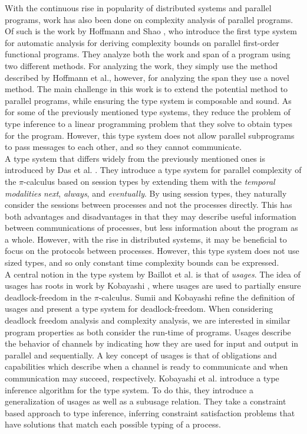 With the continuous rise in popularity of distributed systems and parallel programs, work has also been done on complexity analysis of parallel programs. Of such is the work by Hoffmann and Shao \cite{HoffmannShao2015}, who introduce the first type system for automatic analysis for deriving complexity bounds on parallel first-order functional programs. They analyze both the work and span of a program using two different methods. For analyzing the work, they simply use the method described by Hoffmann et al., however, for analyzing the span they use a novel method. The main challenge in this work is to extend the potential method to parallel programs, while ensuring the type system is composable and sound. As for some of the previously mentioned type systems, they reduce the problem of type inference to a linear programming problem that they solve to obtain types for the program. However, this type system does not allow parallel subprograms to pass messages to each other, and so they cannot communicate.\\

A type system that differs widely from the previously mentioned ones is introduced by Das et al. \cite{DasEtAl2018}. They introduce a type system for parallel complexity of the $\pi$-calculus based on session types by extending them with the \textit{temporal modalities} \textit{next}, \textit{always}, and \textit{eventually}. By using session types, they naturally consider the sessions between processes and not the processes directly. This has both advantages and disadvantages in that they may describe useful information between communications of processes, but less information about the program as a whole. However, with the rise in distributed systems, it may be beneficial to focus on the protocols between processes. However, this type system does not use sized types, and so only constant time complexity bounds can be expressed.\\

A central notion in the type system by Baillot et al. is that of \textit{usages}. The idea of usages has roots in work by Kobayashi \cite{Kobayashi1998}, where usages are used to partially ensure deadlock-freedom in the $\pi$-calculus. Sumii and Kobayashi \cite{SumiiKobayashi1998} refine the definition of usages and present a type system for deadlock-freedom. When considering deadlock freedom analysis and complexity analysis, we are interested in similar program properties as both consider the run-time of programs. Usages describe the behavior of channels by indicating how they are used for input and output in parallel and sequentially. A key concept of usages is that of obligations and capabilities which describe when a channel is ready to communicate and when communication may succeed, respectively. Kobayashi et al. \cite{KobayashiEtAl2000} introduce a type inference algorithm for the type system. To do this, they introduce a generalization of usages as well as a subusage relation. They take a constraint based approach to type inference, inferring constraint satisfaction problems that have solutions that match each possible typing of a process.\\

